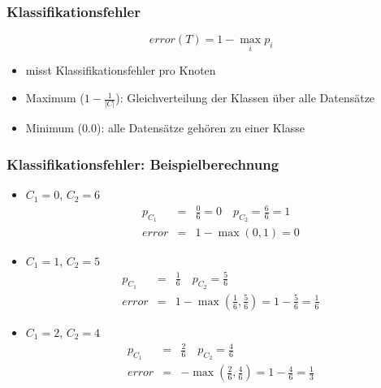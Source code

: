 
\begin{frame}
\frametitle{Klassifikationsfehler}

$$
\textit{error}(T) = 1 - \underset{i}{\max} p_i
$$
\begin{itemize}
\item misst Klassifikationsfehler pro Knoten
\item Maximum ($1 - \frac{1}{|C|}$): Gleichverteilung der Klassen über
  alle Datensätze 
\item Minimum ($0.0$): alle Datensätze gehören zu einer Klasse

\end{itemize}

\end{frame}


\begin{frame}
\frametitle{Klassifikationsfehler: Beispielberechnung}

\begin{itemize}
\item $C_1 = 0$, $C_2 = 6$
\begin{eqnarray*}
p_{C_1}&=&\frac{0}{6} = 0 \quad p_{C_2}=\frac{6}{6}=1\\
\textit{error}&=&1 - \max (0,1) = 0
\end{eqnarray*}
\item $C_1 = 1$, $C_2 = 5$
\begin{eqnarray*}
p_{C_1}&=&\frac{1}{6} \quad p_{C_2}=\frac{5}{6}\\
\textit{error}&=&1 - \max(\frac{1}{6}, \frac{5}{6}) = 1 - \frac{5}{6} =
\frac{1}{6}  
\end{eqnarray*}
\item $C_1 = 2$, $C_2 = 4$
\begin{eqnarray*}
p_{C_1}&=&\frac{2}{6} \quad p_{C_2}=\frac{4}{6}\\
\textit{error}&=& - \max(\frac{2}{6}, \frac{4}{6}) = 1 - \frac{4}{6} =
\frac{1}{3}  
\end{eqnarray*}
\end{itemize}
\end{frame}



